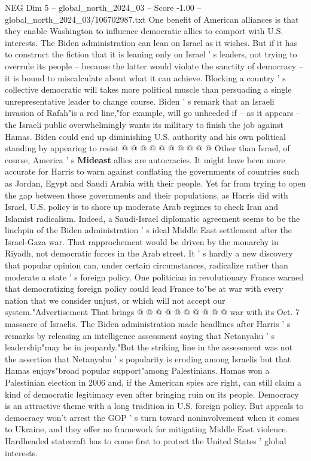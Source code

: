 \begin{textsample}{NEG Dim 5 – global\_north\_2024\_03 – Score -1.00 – global\_north\_2024\_03/106702987.txt}
One benefit of American alliances is that they enable Washington to influence democratic allies to comport with U.S. interests.
The Biden administration can lean on Israel as it wishes.
But if it has to construct the fiction that it is leaning only on Israel ' s leaders, not trying to overrule its people -- because the latter would violate the sanctity of democracy -- it is bound to miscalculate about what it can achieve.
Blocking a country ' s collective democratic will takes more political muscle than persuading a single unrepresentative leader to change course.
Biden ' s remark that an Israeli invasion of Rafah"is a red line,"for example, will go unheeded if -- as it appears -- the Israeli public overwhelmingly wants its military to finish the job against Hamas.
Biden could end up diminishing U.S. authority and his own political standing by appearing to resist @ @ @ @ @ @ @ @ @ @ Other than Israel, of course, America ' s \textbf{Mideast} allies are autocracies.
It might have been more accurate for Harris to warn against conflating the governments of countries such as Jordan, Egypt and Saudi Arabia with their people.
Yet far from trying to open the gap between those governments and their populations, as Harris did with Israel, U.S. policy is to shore up moderate Arab regimes to check Iran and Islamist radicalism.
Indeed, a Saudi-Israel diplomatic agreement seems to be the linchpin of the Biden administration ' s ideal Middle East settlement after the Israel-Gaza war.
That rapprochement would be driven by the monarchy in Riyadh, not democratic forces in the Arab street.
It ' s hardly a new discovery that popular opinion can, under certain circumstances, radicalize rather than moderate a state ' s foreign policy.
One politician in revolutionary France warned that democratizing foreign policy could lead France to"be at war with every nation that we consider unjust, or which will not accept our system."Advertisement That brings @ @ @ @ @ @ @ @ @ @ war with its Oct. 7 massacre of Israelis.
The Biden administration made headlines after Harris ' s remarks by releasing an intelligence assessment saying that Netanyahu ' s leadership"may be in jeopardy."But the striking line in the assessment was not the assertion that Netanyahu ' s popularity is eroding among Israelis but that Hamas enjoys"broad popular support"among Palestinians.
Hamas won a Palestinian election in 2006 and, if the American spies are right, can still claim a kind of democratic legitimacy even after bringing ruin on its people.
Democracy is an attractive theme with a long tradition in U.S. foreign policy.
But appeals to democracy won't arrest the GOP ' s turn toward noninvolvement when it comes to Ukraine, and they offer no framework for mitigating Middle East violence.
Hardheaded statecraft has to come first to protect the United States ' global interests.

\end{textsample}
